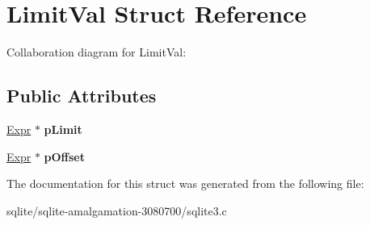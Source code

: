 \hypertarget{struct_limit_val}{\section{Limit\+Val Struct Reference}
\label{struct_limit_val}
}


Collaboration diagram for Limit\+Val\+:
\subsection*{Public Attributes}
\begin{DoxyCompactItemize}
\item 
\hypertarget{struct_limit_val_a96094d1b395a3f455263ff5907d72ed6}{\hyperlink{struct_expr}{Expr} $\ast$ {\bfseries p\+Limit}}\label{struct_limit_val_a96094d1b395a3f455263ff5907d72ed6}

\item 
\hypertarget{struct_limit_val_a43dedf453a8e5cb8091fcde524a7c736}{\hyperlink{struct_expr}{Expr} $\ast$ {\bfseries p\+Offset}}\label{struct_limit_val_a43dedf453a8e5cb8091fcde524a7c736}

\end{DoxyCompactItemize}


The documentation for this struct was generated from the following file\+:\begin{DoxyCompactItemize}
\item 
sqlite/sqlite-\/amalgamation-\/3080700/sqlite3.\+c\end{DoxyCompactItemize}
